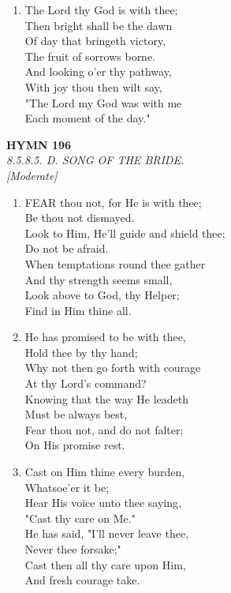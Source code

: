 \begin{enumerate}
    \item The Lord thy God is with thee; \\
        Then bright shall be the dawn \\
        Of day that bringeth victory, \\
        The fruit of sorrows borne. \\
        And looking o'er thy pathway, \\
        With joy thou then wilt say, \\
        "The Lord my God was with me \\
        Each moment of the day."

\end{enumerate}

\newpage
\begin{center}
    {\Large \textbf{HYMN 196}}
    \\
    \textit{8.5.8.5. D. SONG OF THE BRIDE.}
    \\
    \textit{\small [Moderate]}
\end{center}
\vspace{1em}

\begin{enumerate}
    \item FEAR thou not, for He is with thee; \\
        Be thou not dismayed. \\
        Look to Him, He'll guide and shield thee; \\
        Do not be afraid. \\
        When temptations round thee gather \\
        And thy strength seems small, \\
        Look above to God, thy Helper; \\
        Find in Him thine all.

    \item He has promised to be with thee, \\
        Hold thee by thy hand; \\
        Why not then go forth with courage \\
        At thy Lord's command? \\
        Knowing that the way He leadeth \\
        Must be always best, \\
        Fear thou not, and do not falter; \\
        On His promise rest.

    \item Cast on Him thine every burden, \\
        Whatsoe'er it be; \\
        Hear His voice unto thee saying, \\
        "Cast thy care on Me." \\
        He has said, "I'll never leave thee, \\
        Never thee forsake;" \\
        Cast then all thy care upon Him, \\
        And fresh courage take.

\end{enumerate}

